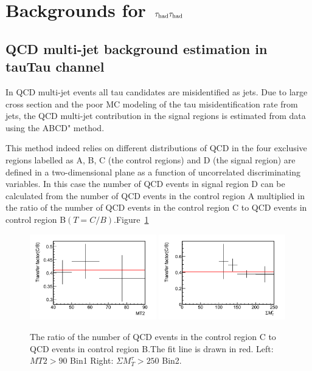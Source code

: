 \section{\texorpdfstring{Backgrounds for $\,\tau_{\rm had}\tau_{\rm had}$}{Backgrounds for tauTau}}
\label{sect:bkg}


\subsection{QCD multi-jet background estimation in tauTau channel}



In QCD multi-jet events all tau candidates are misidentified as jets. Due to large cross
section and
the poor MC modeling of the tau misidentification rate from jets, the QCD multi-jet contribution in the signal regions is estimated from data using the ABCD" method.

This method indeed relies on different distributions of QCD
in the four exclusive regions labelled as A, B, C (the control regions) and D (the signal region) are defined in a two-dimensional plane as a function of uncorrelated discriminating variables.
In this case the number of QCD events in signal region D can be calculated from the number of QCD events in the control region A multiplied in the ratio of the number of QCD events in the control region C to QCD events in control region B$(T=C/B)$.Figure~\ref{fig:1QCDbg} 

\begin{figure}[htbp]
\centering
\includegraphics[width=0.49\textwidth]{QCDbginTauTau/Bin1_transferfactor.png}
\includegraphics[width=0.49\textwidth]{QCDbginTauTau/Bin2_transferfactor.png} \\
\caption{The ratio of the number of QCD events in the control region C to QCD events in control region B.The
fit line  is drawn in red.
 Left:  $MT2>90$ Bin1   Right:  $\Sigma M_{T}^{\tau} >250$ Bin2.}
\label{fig:1QCDbg}
\end{figure}

